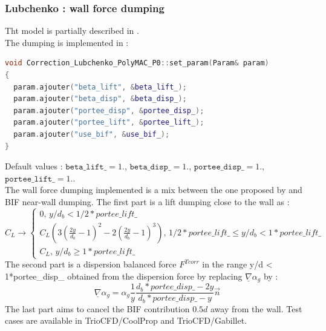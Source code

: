 \subsubsection{Lubchenko : wall force dumping}
Tht model is partially described in \cite{LUBCHENKO201836}.\\
The dumping is implemented in :
\begin{lstlisting}[language=c++]
void Correction_Lubchenko_PolyMAC_P0::set_param(Param& param)
{
  param.ajouter("beta_lift", &beta_lift_);
  param.ajouter("beta_disp", &beta_disp_);
  param.ajouter("portee_disp", &portee_disp_);
  param.ajouter("portee_lift", &portee_lift_);
  param.ajouter("use_bif", &use_bif_);
}
\end{lstlisting}
Default values :   $\texttt{beta\_lift\_} =  1. $, $\texttt{beta\_disp\_}=  1. $, $\texttt{portee\_disp\_}= 1.$, $\texttt{portee\_lift\_}= 1.$.\\
The wall force dumping implemented is a mix between the one proposed by \cite{Lubchenko2018} and BIF near-wall dumping.
The first part is a lift dumping close to the wall as :
\begin{equation}
	C_L \rightarrow \begin{cases} 0 \text{,~} y/d_b<1/2*portee\_lift\_  \\
	C_L\left(3\left(\frac{2y}{d_b}-1\right)^2-2\left(\frac{2y}{d_b}-1\right)^3\right) \text{,~} 1/2*portee\_lift\_ \leq y/d_b < 1*portee\_lift\_ \\
	C_L \text{,~} y/d_b\geq 1*portee\_lift\_ \end{cases}
\end{equation}
The second part is a dispersion balanced force $F^{Tcorr}$ in the range y/d < 1*portee\_disp\_  obtained from the dispersion force by replacing $\underline{\nabla}\alpha_g$ by :
\begin{equation}
	 \underline{\nabla}\alpha_g = \alpha_g\frac{1}{y}\frac{d_b*portee\_disp\_-2y}{d_b*portee\_disp\_-y}\overrightarrow{n}
\end{equation}
The last part aims to cancel the BIF contribution $0.5d$ away from the wall.
Test cases are available in TrioCFD/CoolProp and TrioCFD/Gabillet.


